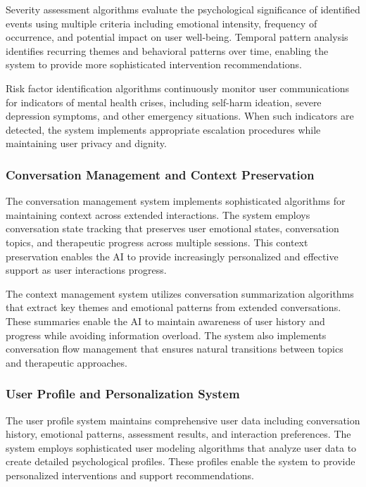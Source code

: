 Severity assessment algorithms evaluate the psychological significance of identified events using multiple criteria including emotional intensity, frequency of occurrence, and potential impact on user well-being. Temporal pattern analysis identifies recurring themes and behavioral patterns over time, enabling the system to provide more sophisticated intervention recommendations.

Risk factor identification algorithms continuously monitor user communications for indicators of mental health crises, including self-harm ideation, severe depression symptoms, and other emergency situations. When such indicators are detected, the system implements appropriate escalation procedures while maintaining user privacy and dignity.

\subsubsection{Conversation Management and Context Preservation}

The conversation management system implements sophisticated algorithms for maintaining context across extended interactions. The system employs conversation state tracking that preserves user emotional states, conversation topics, and therapeutic progress across multiple sessions. This context preservation enables the AI to provide increasingly personalized and effective support as user interactions progress.

The context management system utilizes conversation summarization algorithms that extract key themes and emotional patterns from extended conversations. These summaries enable the AI to maintain awareness of user history and progress while avoiding information overload. The system also implements conversation flow management that ensures natural transitions between topics and therapeutic approaches.

\subsubsection{User Profile and Personalization System}

The user profile system maintains comprehensive user data including conversation history, emotional patterns, assessment results, and interaction preferences. The system employs sophisticated user modeling algorithms that analyze user data to create detailed psychological profiles. These profiles enable the system to provide personalized interventions and support recommendations.


